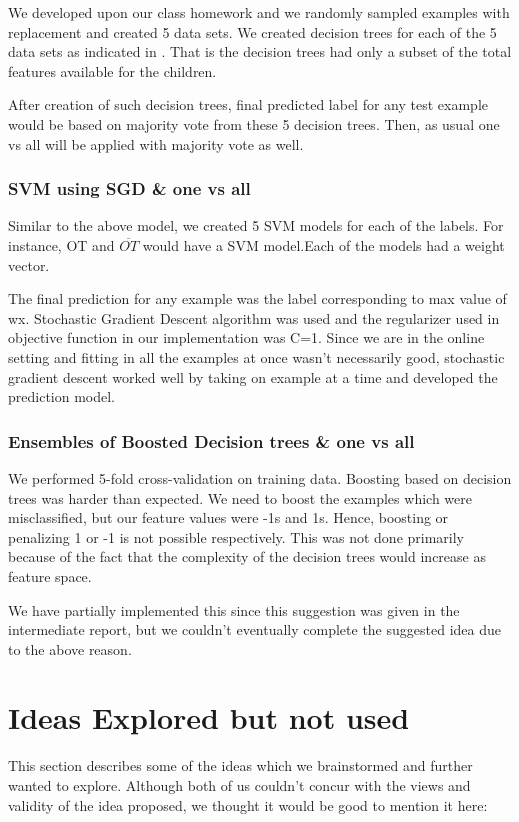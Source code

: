 \documentclass[letterpaper,twocolumn,11pt]{article}
\begin{document}
We developed upon our class homework and we randomly sampled examples with replacement and created 5 data sets. We created decision trees for each of the 5 data sets as indicated in \cite{rfwiki}. That is the decision trees had only a subset of the total features available for the children.

After creation of such decision trees, final predicted label for any test example would be based on majority vote from these 5 decision trees. Then, as usual one vs all will be applied with majority vote as well.

\subsubsection{SVM using SGD \& one vs all}
Similar to the above model, we created 5 SVM models for each of the labels. For instance, OT and $\overline{OT}$ would have a SVM model.Each of the models had a weight vector.

The final prediction for any example was the label corresponding to max value of wx. Stochastic Gradient Descent algorithm was used and the regularizer used in objective function in our implementation was C=1. Since we are in the online setting and fitting in all the examples at once wasn't necessarily good, stochastic gradient descent worked well by taking on example at a time and developed the prediction model.

\subsubsection{Ensembles of Boosted Decision trees \& one vs all}
We performed 5-fold cross-validation on training data. Boosting based on decision trees was harder than expected. We need to boost the examples which were misclassified, but our feature values were -1s and 1s. Hence, boosting or penalizing 1 or -1 is not possible respectively. This was not done primarily because of the fact that the complexity of the decision trees would increase as feature space.

We have partially implemented this since this suggestion was given in the intermediate report, but we couldn't eventually complete the suggested idea due to the above reason. 

\section{Ideas Explored but not used}
This section describes some of the ideas which we brainstormed and further wanted to explore. Although both of us couldn't concur with the views and validity of the idea proposed, we thought it would be good to mention it here:
\end{document}
